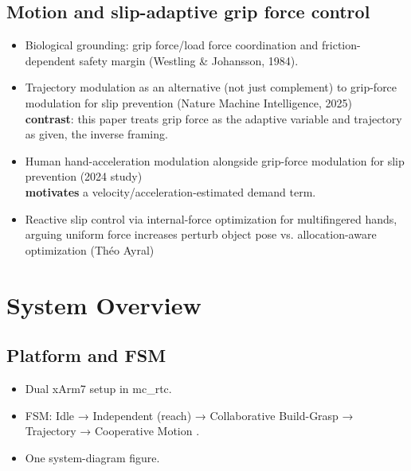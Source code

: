 \documentclass[conference]{IEEEtran}
\begin{document}
\subsection*{Motion and slip-adaptive grip force control}
\begin{itemize}
    \item Biological grounding: grip force/load force coordination and friction-dependent safety margin (Westling \& Johansson, 1984).
    \item Trajectory modulation as an alternative (not just complement) to grip-force modulation for slip prevention (Nature Machine Intelligence, 2025)  \\ \textbf{contrast}: this paper treats grip force as the adaptive variable and trajectory as given, the inverse framing.
    \item Human hand-acceleration modulation alongside grip-force modulation for slip prevention (2024 study) \\  \textbf{motivates} a velocity/acceleration-estimated demand term.
    \item Reactive slip control via internal-force optimization for multifingered hands, arguing uniform force increases perturb object pose vs. allocation-aware optimization (Théo Ayral)
\end{itemize}



\section*{System Overview}
\subsection*{Platform and FSM}
\begin{itemize}
    \item Dual xArm7 setup in mc\_rtc.
    \item FSM: Idle → Independent (reach) → Collaborative { Build-Grasp → Trajectory → Cooperative Motion }.
    \item One system-diagram figure.
\end{itemize}
\end{document}
